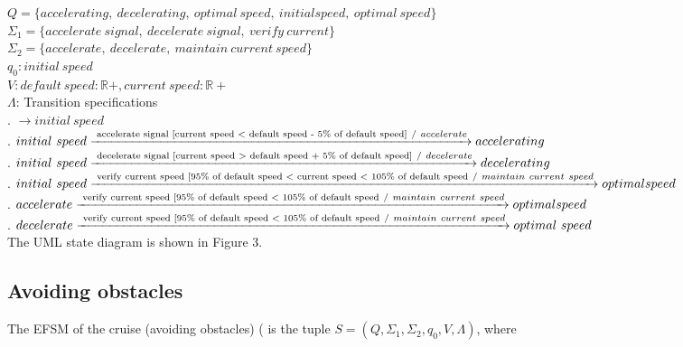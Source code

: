 \documentclass[12pt]{article}
\begin{document}
\begin{spacing}{1.5}
\noindent $Q = \{accelerating,~decelerating,~optimal~speed,~initial speed,~optimal~speed\}$\\
\noindent $\Sigma_1 = \{accelerate~signal,~decelerate~signal,~ verify~current\}$\\
\noindent $\Sigma_2 = \{accelerate,~decelerate,~maintain~current~speed\}$\\
\noindent $q_0: initial~speed$\\
\noindent $V: default~speed: \mathbb R+, current~speed: \mathbb R+$\\
\noindent $\Lambda$: Transition specifications\\
. $\rightarrow initial~speed$\\
. $initial~speed \xrightarrow {\text { accelerate signal [current speed \textless~default speed - 5\% of default speed]}~/ ~accelerate} accelerating$\\
. $initial~speed \xrightarrow {\text { decelerate signal [current speed \textgreater~default speed + 5\% of default speed]}~/ ~decelerate} decelerating$\\
. $initial~speed \xrightarrow {\text { verify current speed [95\% of default speed \textless~current speed \textless~105\% of default speed}~/~maintain~current~speed} optimal speed$\\
. $accelerate \xrightarrow {\text { verify current speed [95\% of default speed \textless~105\% of default speed}~/~maintain~current~speed} optimal speed$\\
. $decelerate \xrightarrow {\text { verify current speed [95\% of default speed \textless~105\% of default speed}~/~maintain~current~speed} optimal~speed$\\


\noindent The UML state diagram is shown in Figure 3.

\newpage

\subsection{Avoiding obstacles}

\noindent The EFSM of the cruise (avoiding obstacles) ( is the tuple $S = (Q, \Sigma_1, \Sigma_2, q_0, V, \Lambda)$, where\\


\end{spacing}
\end{document}
